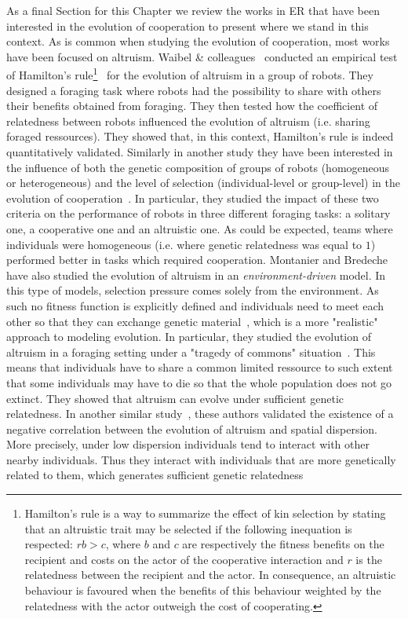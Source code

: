         As a final Section for this Chapter we review the works in ER that have been interested in the evolution of cooperation to present where we stand in this context. As is common when studying the evolution of cooperation, most works have been focused on altruism. Waibel \& colleagues~\parencite{Waibel2011} conducted an empirical test of Hamilton's rule\footnote{Hamilton's rule is a way to summarize the effect of kin selection by stating that an altruistic trait may be selected if the following inequation is respected: $rb > c$, where $b$ and $c$ are respectively the fitness benefits on the recipient and costs on the actor of the cooperative interaction and $r$ is the relatedness between the recipient and the actor. In consequence, an altruistic behaviour is favoured when the benefits of this behaviour weighted by the relatedness with the actor outweigh the cost of cooperating.}~\parencite{Hamilton1964} for the evolution of altruism in a group of robots. They designed a foraging task where robots had the possibility to share with others their benefits obtained from foraging. They then tested how the coefficient of relatedness between robots influenced the evolution of altruism (i.e. sharing foraged ressources). They showed that, in this context, Hamilton's rule is indeed quantitatively validated. Similarly in another study they have been interested in the influence of both the genetic composition of groups of robots (homogeneous or heterogeneous) and the level of selection (individual-level or group-level) in the evolution of cooperation~\parencite{Waibel2009}. In particular, they studied the impact of these two criteria on the performance of robots in three different foraging tasks: a solitary one, a cooperative one and an altruistic one. As could be expected, teams where individuals were homogeneous (i.e. where genetic relatedness was equal to $1$) performed better in tasks which required cooperation. Montanier and Bredeche have also studied the evolution of altruism in an \emph{environment-driven} model. In this type of models, selection pressure comes solely from the environment. As such no fitness function is explicitly defined and individuals need to meet each other so that they can exchange genetic material~\parencite{Bredeche2010}, which is a more "realistic" approach to modeling evolution. In particular, they studied the evolution of altruism in a foraging setting under a "tragedy of commons" situation~\parencite{Hardin1968, Montanier2011}. This means that individuals have to share a common limited ressource to such extent that some individuals may have to die so that the whole population does not go extinct. They showed that altruism can evolve under sufficient genetic relatedness. In another similar study~\parencite{Montanier2013}, these authors validated the existence of a negative correlation between the evolution of altruism and spatial dispersion. More precisely, under low dispersion individuals tend to interact with other nearby individuals. Thus they interact with individuals that are more genetically related to them, which generates sufficient genetic relatedness 